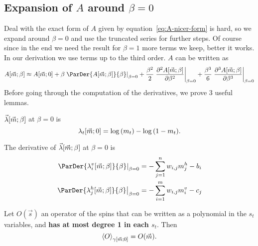 \subsection[Expansion of A around \textbeta=0]{Expansion of \(A\) around \(\beta=0\)}
Deal with the exact form of \(A\) given by equation~\eqref{eq:A-nicer-form} is hard,
so we expand around \(\beta = 0\) and use the truncated series for further steps.
Of course since in the end we need the result for \(\beta=1\) more terms we keep, better
it works. In our derivation we use terms up to the third order.
\(A\) can be written as
\[
  A{\left[\vec{m};\beta\right]} \approx
    A{\left[\vec{m};0\right]} + 
    \beta \left.\ParDer{A{\left[\vec{m};\beta\right]}}{\beta}\right|_{\beta=0} +
    \frac{\beta^2}{2}
      \left.\frac{\partial^2A{\left[\vec{m};\beta\right]}}{\partial\beta^2}\right|_{\beta=0}+
    \frac{\beta^3}{6} 
      \left.\frac{\partial^3A{\left[\vec{m};\beta\right]}}{\partial\beta^3}\right|_{\beta=0}    
\]
Before going through the computation of the derivatives, we prove 3 useful lemmas.
\begin{lemma} \label{lem:lambda-t-zero}
  \(\vec{\lambda}{\left[\vec{m};\beta\right]}\) at \(\beta = 0\) is
  \[
    \lambda_t{\left[\vec{m};0\right]} = \log{\left(m_t\right)} - \log{\left(1-m_t\right)}.
  \]
  \proof 
\end{lemma}
\begin{lemma} \label{lem:first-derivative-lambda}
  The derivative of \(\vec{\lambda}{\left[\vec{m};\beta\right]}\) at \(\beta = 0\) is
  \begin{align*}
    \left.\ParDer{\lvim{\beta}}{\beta}\right|_{\beta=0} &= -\sum_{j=1}^n w_{i,j}m^h_j-b_i\\
    \left.\ParDer{\lhjm{\beta}}{\beta}\right|_{\beta=0} &= -\sum_{i=1}^m w_{i,j}m^v_i-c_j
  \end{align*}
  \proof
\end{lemma}
\begin{lemma} \label{lem:operator-mean-gamma}
  Let \(O{(\vec{s})}\) an operator of the spins that can be written as a polynomial in the \(s_t\)
  variables, and \textbf{has at most degree 1 in each \(s_t\)}. Then
  \[
    \left\langle O\right\rangle_{\gamma{\left[\vec{m};0\right]}} = O{(\vec{m})}.
  \]
  \proof
\end{lemma}
